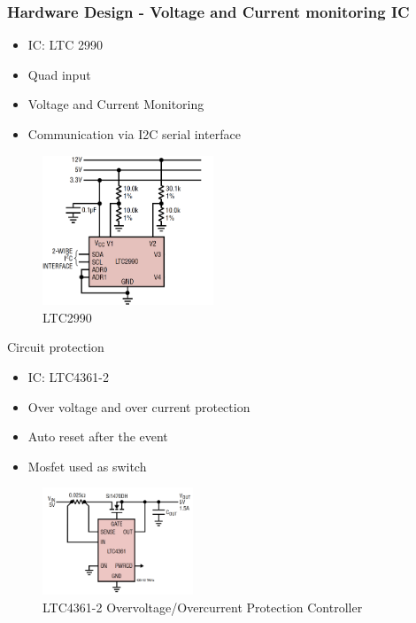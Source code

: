 \documentclass[aspectratio=169]{beamer}
\begin{document}
		
	\begin{frame}
		\frametitle{Hardware Design - Voltage and Current monitoring IC}
		
		\begin{minipage}{0.5\textwidth}
		\begin{itemize}
	\item IC: LTC 2990
	\item Quad input
	\item Voltage and Current Monitoring
	\item Communication via I2C serial interface
\end{itemize}
		\end{minipage}
		\begin{minipage}{0.3\textwidth}
			\begin{figure}
				\includegraphics[width=5.1cm]{diag/sense.png}
				\begin{center}
					\caption{LTC2990}
				\end{center}
				\label{fig:trac2}
				
			\end{figure}
			
		\end{minipage}
		
	\end{frame}
	
	\begin{frame}{Circuit protection}
	\begin{itemize}

      \item IC: LTC4361-2
      \item Over voltage and over current protection
      \item Auto reset after the event
      \item Mosfet used as switch

    \end{itemize}

    \begin{figure}[h]
			\centering
			\includegraphics[width=0.4\textwidth]{diag/Protecc.png}
			\caption{LTC4361-2 Overvoltage/Overcurrent
Protection Controller}
			\label{fig:mesh1}
		\end{figure}
	\end{frame}
\end{document}
